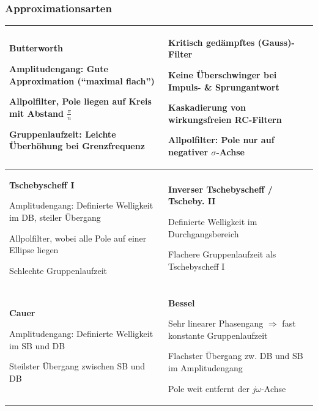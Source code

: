 \subsubsection{Approximationsarten }
\begin{tabular}{|p{9cm}|p{9cm}|}
\hline
\parbox{9cm}{
	\textbf{Butterworth} 
	\begin{liste}
	 \item Amplitudengang: Gute Approximation (``maximal flach'')
	 \item Allpolfilter, Pole liegen auf Kreis mit Abstand
	 $\frac{\pi}{n}$
	 \item Gruppenlaufzeit: Leichte Überhöhung bei
	 Grenzfrequenz
	\end{liste}
	}
& \parbox{9cm}{
	\textbf{Kritisch gedämpftes (Gauss)-Filter} 
	\begin{liste}
	 \item Keine Überschwinger bei Impuls- \& Sprungantwort
	 \item Kaskadierung von wirkungsfreien RC-Filtern
	 \item Allpolfilter: Pole nur auf negativer $\sigma$-Achse
	\end{liste}
	} \\
\hline
\parbox{9cm}{
	\textbf{Tschebyscheff I} 
	\begin{liste}
	 \item Amplitudengang: Definierte Welligkeit im DB, steiler Übergang
	 \item Allpolfilter, wobei alle Pole auf einer Ellipse liegen
	 \item Schlechte Gruppenlaufzeit
	\end{liste}
	}
& \parbox{9cm}{
	\textbf{Inverser Tschebyscheff  / Tscheby. II} 
	\begin{liste}
	 \item Definierte Welligkeit im Durchgangsbereich
	 \item Flachere Gruppenlaufzeit als Tschebyscheff I
	\end{liste}
	} \\
\hline
\parbox{6cm}{
	\textbf{Cauer} 
	\begin{liste}
	 \item Amplitudengang: Definierte Welligkeit im SB und DB
	 \item Steilster Übergang zwischen SB und DB
	\end{liste}
	}
& \parbox{6cm}{
	\textbf{Bessel} 
	\begin{liste}
	 \item Sehr linearer Phasengang $\Rightarrow$ fast konstante Gruppenlaufzeit
	 \item Flachster Übergang zw. DB und SB im Amplitudengang
	 \item Pole weit entfernt der $j \omega$-Achse
	\end{liste}
	} \\
\hline
\end{tabular}

